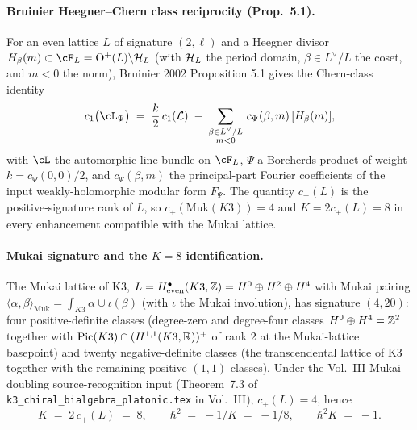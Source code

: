 \paragraph{Bruinier Heegner--Chern class reciprocity (Prop.~5.1).}
For an even lattice $L$ of signature $(2, \ell)$ and a Heegner
divisor $H_\beta(m) \subset \cF_L = \mathrm{O}^+(L)\backslash\cH_L$
(with $\mathcal{H}_L$ the period domain, $\beta \in L^\vee/L$ the coset, and
$m < 0$ the norm), Bruinier 2002 Proposition 5.1 gives the Chern-class
identity
\begin{equation}
\label{eq:voa-bruinier-heegner-chern}
  c_1\bigl(\cL_{\Psi}\bigr) \;=\; \frac{k}{2}\,c_1(\mathcal L)
  \;-\; \sum_{\substack{\beta \in L^\vee/L \\ m < 0}}\,c_\Psi(\beta, m)\,[H_\beta(m)],
\end{equation}
with $\cL$ the automorphic line bundle on $\cF_L$, $\Psi$ a Borcherds
product of weight $k = c_\Psi(0, 0)/2$, and $c_\Psi(\beta, m)$ the
principal-part Fourier coefficients of the input weakly-holomorphic
modular form $F_\Psi$. The quantity $c_+(L)$ is the positive-signature
rank of $L$, so $c_+(\mathrm{Muk}(K3)) = 4$ and $K = 2c_+(L) = 8$ in
every enhancement compatible with the Mukai lattice.

\paragraph{Mukai signature and the $K = 8$ identification.}
The Mukai lattice of K3, $L = H^\bullet_{\mathrm{even}}(K3, \mathbb{Z}) =
H^0 \oplus H^2 \oplus H^4$ with Mukai pairing
$\langle\alpha,\beta\rangle_{\mathrm{Muk}} = \int_{K3}\alpha\cup\iota(\beta)$
(with $\iota$ the Mukai involution), has signature $(4, 20)$: four
positive-definite classes (degree-zero and degree-four classes $H^0
\oplus H^4 = \mathbb{Z}^2$ together with $\mathrm{Pic}(K3) \cap
(H^{1,1}(K3,\mathbb{R}))^+$ of rank 2 at the Mukai-lattice basepoint) and
twenty negative-definite classes (the transcendental lattice of K3
together with the remaining positive $(1,1)$-classes). Under the
Vol.~III Mukai-doubling source-recognition input
(Theorem~7.3 of \texttt{k3\_chiral\_bialgebra\_platonic.tex} in
Vol.~III), $c_+(L) = 4$, hence
\begin{equation}
\label{eq:voa-K-8-Mukai}
  K \;=\; 2\,c_+(L) \;=\; 8, \qquad \hbar^2 \;=\; -1/K \;=\; -1/8, \qquad \hbar^2 K \;=\; -1.
\end{equation}

